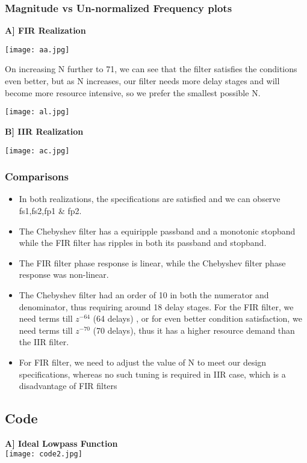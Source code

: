 \documentclass[12pt]{article}
\begin{document}
\subsubsection{Magnitude vs Un-normalized Frequency plots}
\textbf{A] FIR Realization}
\begin{center}
    \texttt{[image: aa.jpg]}
\end{center}
On increasing N further to 71, we can see that the filter satisfies the conditions even better, but as N increases, our filter needs more delay stages and will become more resource intensive, so we prefer the smallest possible N.
\begin{center}
    \texttt{[image: al.jpg]}
\end{center}
\textbf{B] IIR Realization}
\begin{center}
    \texttt{[image: ac.jpg]}
\end{center}
\subsubsection{Comparisons}
\begin{itemize}
    \item In both realizations, the specifications are satisfied and we can observe fs1,fs2,fp1 \& fp2.
    \item The Chebyshev filter has a equiripple passband and a monotonic stopband while the FIR filter has ripples in both its passband and stopband.
    \item The FIR filter phase response is linear, while the Chebyshev filter phase response was non-linear.
    \item The Chebyshev filter had an order of 10 in both the numerator and denominator, thus requiring around 18 delay stages. For the FIR filter, we need terms till $z^{-64}$ (64 delays) , or for even better condition satisfaction, we need terms till $z^{-70}$ (70 delays), thus it has a higher resource demand than the IIR filter.
    \item For FIR filter, we need to adjust the value of N to meet our design specifications, whereas no such
tuning is required in IIR case, which is a disadvantage of FIR filters
\end{itemize}



\subsection{Code}
\textbf{A] Ideal Lowpass Function}
\\\texttt{[image: code2.jpg]}
\end{document}
